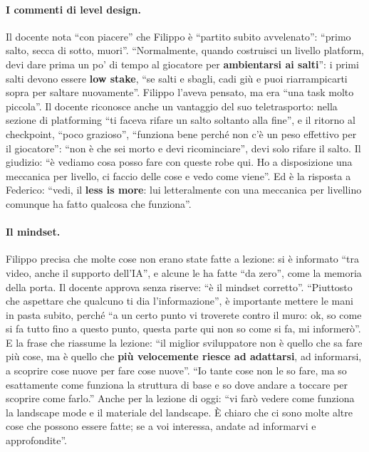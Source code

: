 \paragraph{I commenti di level design.} Il docente nota ``con piacere'' che Filippo è
``partito subito avvelenato'': ``primo salto, secca di sotto, muori''. ``Normalmente, quando
costruisci un livello platform, devi dare prima un po' di tempo al giocatore per
\textbf{ambientarsi ai salti}'': i primi salti devono essere \textbf{low stake}, ``se salti e
sbagli, cadi giù e puoi riarrampicarti sopra per saltare nuovamente''. Filippo l'aveva
pensato, ma era ``una task molto piccola''. Il docente riconosce anche un vantaggio del suo
teletrasporto: nella sezione di platforming ``ti faceva rifare un salto soltanto alla
fine'', e il ritorno al checkpoint, ``poco grazioso'', ``funziona bene perché non c'è un
peso effettivo per il giocatore'': ``non è che sei morto e devi ricominciare'', devi solo
rifare il salto. Il giudizio: ``è vediamo cosa posso fare con queste robe qui. Ho a
disposizione una meccanica per livello, ci faccio delle cose e vedo come viene''. Ed è la
risposta a Federico: ``vedi, il \textbf{less is more}: lui letteralmente con una meccanica
per livellino comunque ha fatto qualcosa che funziona''.

\paragraph{Il mindset.} Filippo precisa che molte cose non erano state fatte a lezione: si
è informato ``tra video, anche il supporto dell'IA'', e alcune le ha fatte ``da zero'', come
la memoria della porta. Il docente approva senza riserve: ``è il mindset corretto''.
``Piuttosto che aspettare che qualcuno ti dia l'informazione'', è importante mettere le mani
in pasta subito, perché ``a un certo punto vi troverete contro il muro: ok, so come si fa
tutto fino a questo punto, questa parte qui non so come si fa, mi informerò''. E la frase
che riassume la lezione: ``il miglior sviluppatore non è quello che sa fare più cose, ma è
quello che \textbf{più velocemente riesce ad adattarsi}, ad informarsi, a scoprire cose nuove
per fare cose nuove''. ``Io tante cose non le so fare, ma so esattamente come funziona la
struttura di base e so dove andare a toccare per scoprire come farlo.'' Anche per la
lezione di oggi: ``vi farò vedere come funziona la landscape mode e il materiale del
landscape. È chiaro che ci sono molte altre cose che possono essere fatte; se a voi
interessa, andate ad informarvi e approfondite''.

